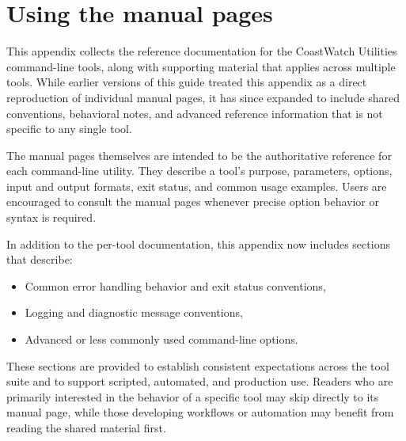 \section{Using the manual pages}

This appendix collects the reference documentation for the CoastWatch Utilities command-line tools, along with supporting material that applies across multiple tools. While earlier versions of this guide treated this appendix as a direct reproduction of individual manual pages, it has since expanded to include shared conventions, behavioral notes, and advanced reference information that is not specific to any single tool.

The manual pages themselves are intended to be the authoritative reference for each command-line utility. They describe a tool’s purpose, parameters, options, input and output formats, exit status, and common usage examples. Users are encouraged to consult the manual pages whenever precise option behavior or syntax is required.

In addition to the per-tool documentation, this appendix now includes sections that describe:
\begin{itemize}
  \item Common error handling behavior and exit status conventions,
  \item Logging and diagnostic message conventions,
  \item Advanced or less commonly used command-line options.
\end{itemize}

These sections are provided to establish consistent expectations across the tool suite and to support scripted, automated, and production use. Readers who are primarily interested in the behavior of a specific tool may skip directly to its manual page, while those developing workflows or automation may benefit from reading the shared material first.
